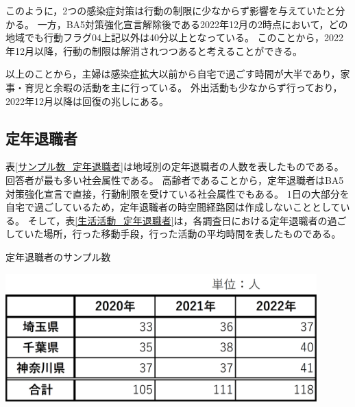 \documentclass[paper={210mm,297mm},fontsize=15Q,line_length=35zw,number_of_lines=31,head_space=30mm,gutter=40mm,baselineskip=2.0zw,headfoot_verticalposition=1.5zw]{jlreq}
\begin{document}
このように，2つの感染症対策は行動の制限に少なからず影響を与えていたと分かる。
一方，BA5対策強化宣言解除後である2022年12月の2時点において，どの地域でも行動フラグ04上記以外は40分以上となっている。
このことから，2022年12月以降，行動の制限は解消されつつあると考えることができる。

以上のことから，主婦は感染症拡大以前から自宅で過ごす時間が大半であり，家事・育児と余暇の活動を主に行っている。
外出活動も少なからず行っており，2022年12月以降は回復の兆しにある。

\newpage

\subsection{定年退職者}

表\ref{サンプル数_定年退職者}は地域別の定年退職者の人数を表したものである。
回答者が最も多い社会属性である。
高齢者であることから，定年退職者はBA5対策強化宣言で直接，行動制限を受けている社会属性でもある。
1日の大部分を自宅で過ごしているため，定年退職者の時空間経路図は作成しないこととしている。
そして，表\ref{生活活動_定年退職者}は，各調査日における定年退職者の過ごしていた場所，行った移動手段，行った活動の平均時間を表したものである。

\begin{table}[H]
  \centering
  \caption{定年退職者のサンプル数}
  \includegraphics[width=120mm]{../Figure/c04s06_table_定年退職者_サンプル数.png}
  \label{サンプル数_定年退職者}
\end{table}
\end{document}
